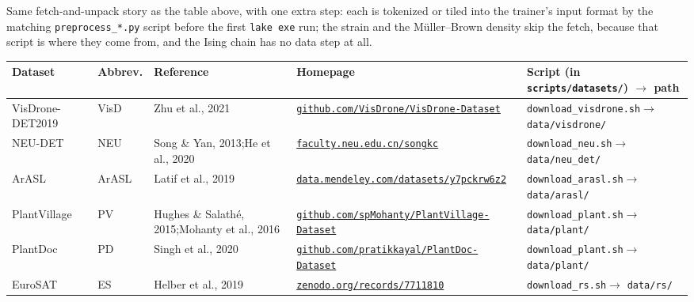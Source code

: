 \noindent Same fetch-and-unpack story as the table above, with one extra
step: each is tokenized or tiled into the trainer's input format by the
matching \texttt{preprocess\_*.py} script before the first \texttt{lake exe}
run; the strain and the M\"uller--Brown density skip the fetch, because
that script is where they come from, and the Ising chain has no data step
at all.

\begin{center}
\footnotesize\setlength{\tabcolsep}{4pt}
\begin{tabular}{@{}l l p{3.2cm} p{4.0cm} p{3.7cm}@{}}
\hline
Dataset & Abbrev. & Reference & Homepage & Script (in \texttt{scripts/datasets/}) $\to$ path \\
\hline
VisDrone-DET2019 & VisD & Zhu et al., 2021 &
  \href{https://github.com/VisDrone/VisDrone-Dataset}{\nolinkurl{github.com/VisDrone/VisDrone-Dataset}} &
  \texttt{download\_visdrone.sh}\newline $\to$ \texttt{data/visdrone/}  \\[2pt]
NEU-DET & NEU & Song \& Yan, 2013;\newline He et al., 2020 &
  \href{http://faculty.neu.edu.cn/songkc/en/zdylm/263265/list/index.htm}{\nolinkurl{faculty.neu.edu.cn/songkc}} &
  \texttt{download\_neu.sh}\newline $\to$ \texttt{data/neu\_det/}  \\[2pt]
ArASL & ArASL & Latif et al., 2019 &
  \href{https://data.mendeley.com/datasets/y7pckrw6z2/1}{\nolinkurl{data.mendeley.com/datasets/y7pckrw6z2}} &
  \texttt{download\_arasl.sh}\newline $\to$ \texttt{data/arasl/}  \\[2pt]
PlantVillage & PV & Hughes \& Salath\'e, 2015;\newline Mohanty et al., 2016 &
  \href{https://github.com/spMohanty/PlantVillage-Dataset}{\nolinkurl{github.com/spMohanty/PlantVillage-Dataset}} &
  \texttt{download\_plant.sh}\newline $\to$ \texttt{data/plant/}  \\[2pt]
PlantDoc & PD & Singh et al., 2020 &
  \href{https://github.com/pratikkayal/PlantDoc-Dataset}{\nolinkurl{github.com/pratikkayal/PlantDoc-Dataset}} &
  \texttt{download\_plant.sh}\newline $\to$ \texttt{data/plant/}  \\[2pt]
EuroSAT & ES & Helber et al., 2019 &
  \href{https://zenodo.org/records/7711810}{\nolinkurl{zenodo.org/records/7711810}} &
  \texttt{download\_rs.sh}\newline $\to$ \texttt{data/rs/}  \\[2pt]

\end{tabular}
\end{center}
